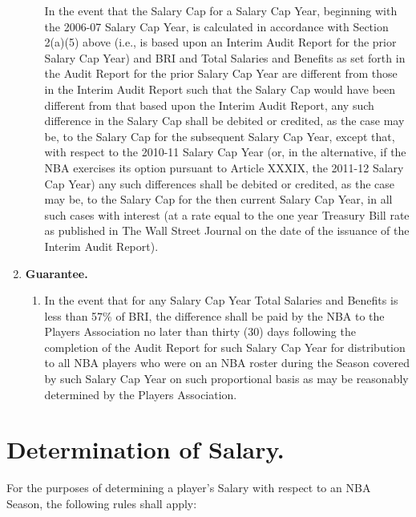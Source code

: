 \documentclass[
]{book}
\providecommand{\tightlist}{%
  \setlength{\itemsep}{0pt}\setlength{\parskip}{0pt}}
\begin{document}
\begin{enumerate}
\begin{enumerate}
    In the event that the Salary Cap for a Salary Cap Year, beginning with the 2006-07 Salary Cap Year, is calculated in accordance with Section 2(a)(5) above (i.e., is based upon an Interim Audit Report for the prior Salary Cap Year) and BRI and Total Salaries and Benefits as set forth in the Audit Report for the prior Salary Cap Year are different from those in the Interim Audit Report such that the Salary Cap would have been different from that based upon the Interim Audit Report, any such difference in the Salary Cap shall be debited or credited, as the case may be, to the Salary Cap for the subsequent Salary Cap Year, except that, with respect to the 2010-11 Salary Cap Year (or, in the alternative, if the NBA exercises its option pursuant to Article XXXIX, the 2011-12 Salary Cap Year) any such differences shall be debited or credited, as the case may be, to the Salary Cap for the then current Salary Cap Year, in all such cases with interest (at a rate equal to the one year Treasury Bill rate as published in The Wall Street Journal on the date of the issuance of the Interim Audit Report).
  \end{enumerate}
\item
  \textbf{Guarantee.}

  \begin{enumerate}
  \def\labelenumii{(\arabic{enumii})}
  \tightlist
  \item
    In the event that for any Salary Cap Year Total Salaries and Benefits is less than 57\% of BRI, the difference shall be paid by the NBA to the Players Association no later than thirty (30) days following the completion of the Audit Report for such Salary Cap Year for distribution to all NBA players who were on an NBA roster during the Season covered by such Salary Cap Year on such proportional basis as may be reasonably determined by the Players Association.
  \end{enumerate}
\end{enumerate}

\hypertarget{determination-of-salary.}{%
\section{Determination of Salary.}\label{determination-of-salary.}}

For the purposes of determining a player's Salary with respect to an NBA Season, the following rules shall apply:
\end{document}
